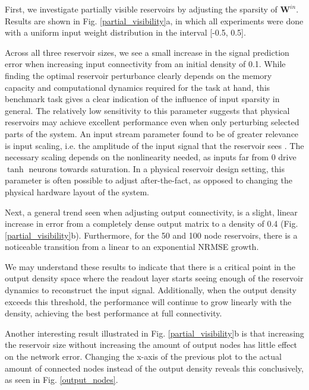First, we investigate partially visible reservoirs by adjusting the sparsity of
$\mathbf{W}^{in}$. Results are shown in Fig. \ref{partial_visibility}a, in which
all experiments were done with a uniform input weight distribution in the
interval [-0.5, 0.5].

Across all three reservoir sizes, we see a small increase in the signal
prediction error when increasing input connectivity from an initial density of
0.1. While finding the optimal reservoir perturbance clearly depends on the
memory capacity and computational dynamics required for the task at hand, this
benchmark task gives a clear indication of the influence of input sparsity in
general. The relatively low sensitivity to this parameter suggests that physical
reservoirs may achieve excellent performance even when only perturbing selected
parts of the system. An input stream parameter found to be of greater relevance
is input scaling, i.e. the amplitude of the input signal that the reservoir sees
\cite{alippi_quantification_2009}. The necessary scaling depends on the
nonlinearity needed, as inputs far from 0 drive $\tanh$ neurons towards
saturation. In a physical reservoir design setting, this parameter is often
possible to adjust after-the-fact, as opposed to changing the physical hardware
layout of the system.

Next, a general trend seen when adjusting output connectivity, is a slight,
linear increase in error from a completely dense output matrix to a density of
0.4 (Fig. \ref{partial_visibility}b). Furthermore, for the 50 and 100 node
reservoirs, there is a noticeable transition from a linear to an exponential
NRMSE growth.

We may understand these results to indicate that there is a critical point in
the output density space where the readout layer starts seeing enough of the
reservoir dynamics to reconstruct the input signal. Additionally, when the
output density exceeds this threshold, the performance will continue to grow
linearly with the density, achieving the best performance at full connectivity.

Another interesting result illustrated in Fig. \ref{partial_visibility}b is that
increasing the reservoir size without increasing the amount of output nodes has
little effect on the network error. Changing the x-axis of the previous plot to
the actual amount of connected nodes instead of the output density reveals this
conclusively, as seen in Fig. \ref{output_nodes}.

